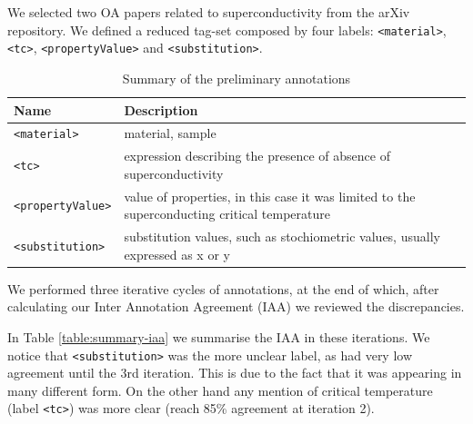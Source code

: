 \documentclass[a4paper,10pt]{article}
\begin{document}
We selected two OA papers related to superconductivity from the arXiv repository. We defined a reduced tag-set composed by four labels: \texttt{<material>}, \texttt{<tc>}, \texttt{<propertyValue>} and \texttt{<substitution>}. 

\begin{table}[h!]
    \centering
    \begin{tabular}{ | m{10em} | m{20em} | } 
    \hline
        Name & Description \\ [0.5ex] 
    \hline\hline
        \texttt{<material>} & material, sample \\
    \hline
        \texttt{<tc>} & expression describing the presence of absence of superconductivity \\
    \hline
        \texttt{<propertyValue>} & value of properties, in this case it was limited to the superconducting critical temperature \\
    \hline
        \texttt{<substitution>} & substitution values, such as stochiometric values, usually expressed as x or y  \\
    \hline
    \end{tabular}
    \caption{Summary of the preliminary annotations}
    \label{table:summary-preliminary-annotation}
\end{table}

We performed three iterative cycles of annotations, at the end of which, after calculating our Inter Annotation Agreement (IAA) we reviewed the discrepancies. 

In Table \ref{table:summary-iaa} we summarise the IAA in these iterations. We notice that \texttt{<substitution>} was the more unclear label, as had very low agreement until the 3rd iteration. This is due to the fact that it was appearing in many different form. On the other hand any mention of critical temperature (label \texttt{<tc>}) was more clear (reach 85\% agreement at iteration 2). 
\end{document}
